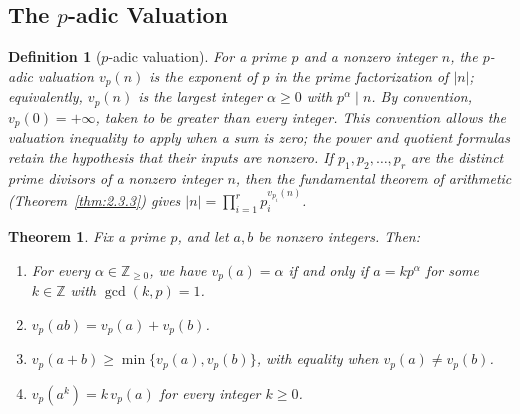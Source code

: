 \documentclass[11pt]{article}
\theoremstyle{ntstyle}
\newtheorem{theorem}{Theorem}[subsection]
\newtheorem{definition}{Definition}[subsection]
\begin{document}
\subsection{The \texorpdfstring{$p$}{p}-adic Valuation}

\begin{definition}[$p$-adic valuation]\label{def:4.5.1}
	For a prime $p$ and a nonzero integer $n$, the $p$-adic valuation
	$v_p(n)$ is the exponent of $p$ in the prime factorization of $|n|$;
	equivalently, $v_p(n)$ is the largest integer $\alpha \ge 0$ with
	$p^{\alpha} \mid n$. By convention, $v_p(0)=+\infty$, taken to be greater than every integer.
	This convention allows the valuation inequality to apply when a sum is zero; the power and quotient
	formulas retain the hypothesis that their inputs are nonzero.
	If $p_1,p_2,\ldots,p_r$ are the distinct prime divisors of a nonzero
	integer $n$, then the fundamental theorem of arithmetic (Theorem~\ref{thm:2.3.3}) gives
	$|n|=\prod_{i=1}^{r}p_i^{v_{p_i}(n)}$.

\end{definition}
\begin{theorem}\label{thm:4.5.1} Fix a prime $p$, and let $a,b$ be
	nonzero integers. Then:

	\begin{enumerate}[label={\alph*)}]
		\item For every $\alpha\in\mathbb{Z}_{\ge0}$, we have $v_p(a)=\alpha$ if and only if
		      $a=kp^{\alpha}$ for some $k\in\mathbb{Z}$ with $\gcd(k,p)=1$.
		\item $v_p(ab) = v_p(a) + v_p(b)$.
		\item $v_p(a + b) \ge \min\{v_p(a), v_p(b)\}$, with equality when
		      $v_p(a) \neq v_p(b)$.
		\item $v_p(a^{k}) = k\, v_p(a)$ for every integer $k \ge 0$.
	\end{enumerate}

\end{theorem}
\end{document}
